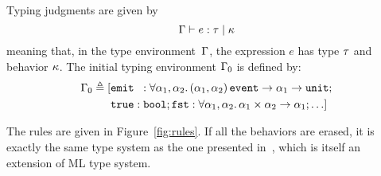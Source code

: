\documentclass[9pt,preprint]{sigplanconf}
\newcommand{\deq}{\triangleq}
\begin{document}
Typing judgments are given by 
\[ \Gamma \vdash e : \tau \mid \kappa \] 
meaning that, in the type environment~$\Gamma$, the expression $e$ has type $\tau$ and behavior $\kappa$. The initial typing environment $\Gamma_0$ is defined by: 
\begin{align*}
\Gamma_0 \deq [
 &\eemit{}{} : \forall  \rtvar_1, \rtvar_2. \, 
        \rtarrow{ \rtsig{\rtvar_1}{\rtvar_2} }{\rtarrow{\rtvar_1}{\unit{}} }; \\
        &\mathtt{true} : \mathtt{bool};
              \mathtt{fst} : \forall \rtvar_1, \rtvar_2.\, \rtarrow{\rtprod{\rtvar_1}{\rtvar_2}}{\rtvar_1};  \ldots ]
\end{align*}

\begin{figure*}
\begin{small}

\end{small}

\caption{Type-and-effect rules}
\label{fig:rules}
\end{figure*}

The rules are given in Figure~\ref{fig:rules}. If all the behaviors are erased, it is exactly the same type system as the one presented in~\cite{Mandel:2005}, which is itself an extension of ML type system. 
\end{document}
